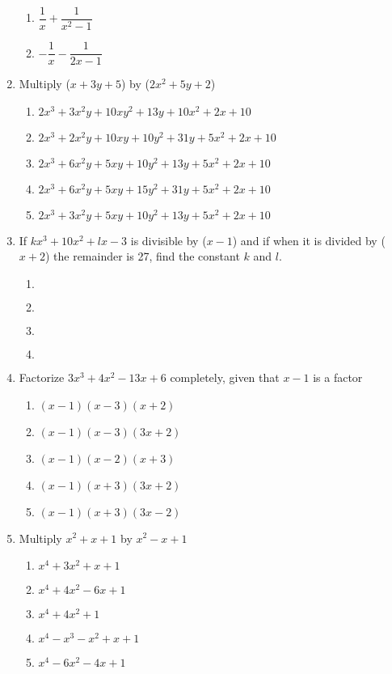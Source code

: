 \begin{multicols}{2}
\begin{enumerate}[label={\arabic*.}]
\begin{enumerate}[label={\Alph*.}]
	\item \(\dfrac{1}{x} + \dfrac{1}{x^2 - 1}\)
	\item \(-\dfrac{1}{x} - \dfrac{1}{2x - 1}\)
	\end{enumerate}
\item Multiply (\(x + 3y + 5\)) by (\(2x^2 + 5y + 2\))
	\begin{enumerate}[label={\Alph*.}]
	\item \(2x^3 + 3x^2y + 10xy^2 + 13y + 10x^2 + 2x + 10\)
	\item \(2x^3 + 2x^2y + 10xy + 10y^2 +  31y + 5x^2 + 2x + 10\)
	\item \(2x^3 + 6x^2y + 5xy + 10y^2 + 13y + 5x^2 + 2x + 10\)
	\item \(2x^3 + 6x^2y + 5xy + 15y^2 + 31y + 5x^2 + 2x + 10\)
	\item \(2x^3 + 3x^2y + 5xy + 10y^2 + 13y + 5x^2 + 2x + 10\)
	\end{enumerate}
\item If \(kx^3 + 	10x^2 + lx - 3\) is divisible by (\(x - 1\)) and if when it is divided by (\(x + 2\)) the remainder is 27,
find the constant \(k\) and \(l\).
	\begin{enumerate}[label={\Alph*.}]
	\item \(\)
	\item \(\)
	\item \(\)
	\item \(\)
	\end{enumerate}
\item Factorize \(3x^3 + 4x^2 - 13x + 6\) completely, given that \(x - 1\) is a factor
	\begin{enumerate}[label={\Alph*.}]
	\item \((x-1)(x-3)(x+2)\)
	\item \((x-1)(x-3)(3x+2)\)
	\item \((x-1)(x-2)(x+3)\)
	\item \((x-1)(x+3)(3x+2)\)
	\item \((x-1)(x+3)(3x-2)\)
	\end{enumerate}
\item Multiply \(x^2+x+1\) by \(x^2-x+1\)
	\begin{enumerate}[label={\Alph*.}]
	\item \(x^4+3x^2+x+1\)
	\item \(x^4+4x^2-6x+1\)
	\item \(x^4+4x^2+1\)
	\item \(x^4-x^3-x^2+x+1\)
	\item \(x^4-6x^2-4x+1\)
	\end{enumerate}

\end{enumerate}
\end{multicols}
